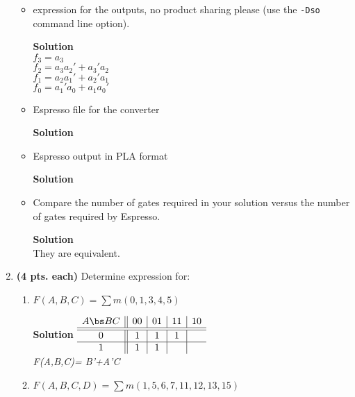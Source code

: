 \begin{enumerate}
\begin{itemize}
            \item \SOPmin expression for the outputs, no product sharing please
                (use the \verb+-Dso+ command line option).
                \begin{onlysolution}
                    \textbf{Solution}\\
                    $f_3 = a_3$\\
                    $f_2 = a_3a_2'+a_3'a_2$\\
                    $f_1 = a_2a_1'+a_2'a_1$\\
                    $f_0 = a_1'a_0+a_1a_0'$
                \end{onlysolution}
            \item Espresso file for the converter
                \begin{onlysolution}
                    \textbf{Solution} 
                \end{onlysolution}
            \item Espresso output in PLA format
                \begin{onlysolution}
                    \textbf{Solution} 
                \end{onlysolution}
            \item Compare the number of gates required in your solution
                versus the number of gates required by Espresso.
                \begin{onlysolution}
                    \textbf{Solution}\\
                    They are equivalent.
                \end{onlysolution}
        \end{itemize}

    \item \textbf{ (4 pts. each)} Determine \SOPmin expression for:
        \begin{enumerate}
            \item $F(A,B,C)=\sum m(0,1,3,4,5)$

                \begin{onlysolution}  \textbf{Solution} \itshape{
                        $
                        \begin{array} {c||c|c|c|c}
                            A   \bs B C  & 00 & 01 & 11 & 10 \\ \hline \hline
                            0        &  1 & 1  & 1  &    \\ \hline
                            1        &  1 & 1  &    &    \\
                        \end{array}$ \\
                        F(A,B,C)= B'+A'C
                    }
                \end{onlysolution}
            \item $F(A,B,C,D)=\sum m(1,5,6,7,11,12,13,15)$


\end{enumerate}
\end{enumerate}
